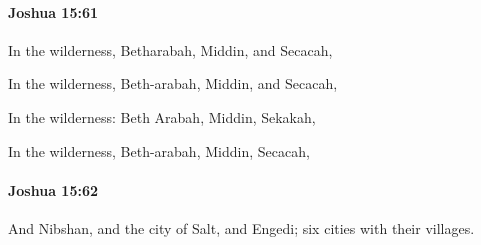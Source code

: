 		\paragraph{Joshua 15:61} %
			\label{JOSHUA-15-61}

			In the wilderness, Betharabah, Middin, and Secacah,

			\begin{versebox}
					\item[BHS] 
					\item[ASV] In the wilderness, Beth-arabah, Middin, and Secacah,
					\item[NIV] In the wilderness: Beth Arabah, Middin, Sekakah,
					\item[NRSV] In the wilderness, Beth-arabah, Middin, Secacah,
			\end{versebox}

		\paragraph{Joshua 15:62} %
			\label{JOSHUA-15-62}

			And Nibshan, and the city of Salt, and Engedi; six cities with their villages.

